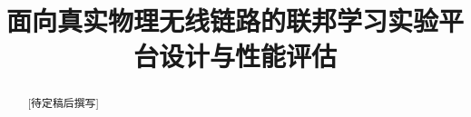 \documentclass[journal,10pt,a4paper]{IEEEtran}
\title{面向真实物理无线链路的联邦学习实验平台设计与性能评估}
\author{}
\begin{document}
\maketitle
\thispagestyle{plain}

\begin{abstract}
[待定稿后撰写]
\end{abstract}






\end{document}
